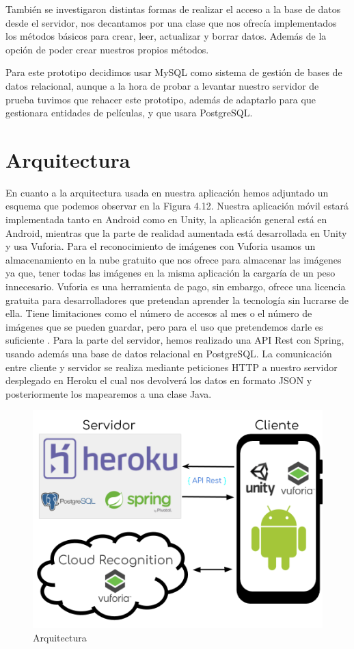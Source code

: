 También se investigaron distintas formas de realizar el acceso a la base de datos desde el servidor, nos decantamos por una clase que nos ofrecía implementados los métodos básicos para crear, leer, actualizar y borrar datos. Además de la opción 
de poder crear nuestros propios métodos.

Para este prototipo decidimos usar MySQL como sistema de gestión de bases de datos relacional, aunque
a la hora de probar a levantar nuestro servidor de prueba tuvimos que rehacer este prototipo, además de adaptarlo para 
que gestionara entidades de películas, y que usara PostgreSQL.
\section{Arquitectura}
\label{makereference4.2}
En cuanto a la arquitectura usada en nuestra aplicación hemos adjuntado un esquema que podemos observar en la Figura 4.12. Nuestra aplicación móvil estará implementada tanto en Android
como en Unity, la aplicación general está en Android, mientras que la parte de realidad aumentada está desarrollada en Unity y usa Vuforia. Para el reconocimiento
de imágenes con Vuforia usamos un almacenamiento en la nube gratuito que nos ofrece para almacenar las imágenes ya que, tener todas las imágenes en la misma aplicación la cargaría de un peso innecesario. Vuforia es una herramienta de pago, sin embargo, 
ofrece una licencia gratuita para desarrolladores que pretendan aprender la tecnología sin lucrarse de ella\cite{vuforia_prices}. Tiene limitaciones como el número de accesos al mes o el número de imágenes que se pueden guardar, pero para el uso que pretendemos 
darle es suficiente \cite{vuforia_free}. 
Para la parte del servidor, hemos realizado una API Rest con Spring, usando además una base de datos relacional en PostgreSQL. La comunicación entre cliente y servidor se realiza mediante peticiones HTTP a 
nuestro servidor desplegado en Heroku el cual nos devolverá los datos en formato JSON y posteriormente los mapearemos a una clase Java.
\begin{figure}[H]
    \centering
    \includegraphics[width=6in]{figures/chapter-4/arquitectura.png}
    \caption{Arquitectura}
\end{figure}

